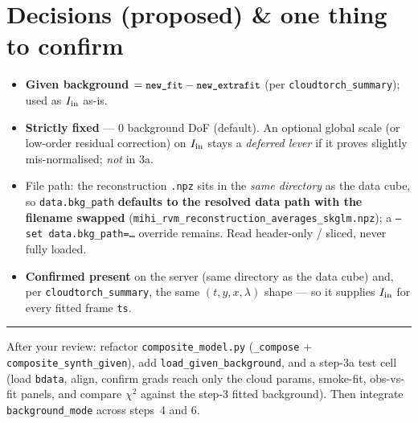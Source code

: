 \documentclass[10pt,a4paper]{article}
\newcommand{\co}[1]{{\small\texttt{#1}}}
\begin{document}
\section{Decisions (proposed) \& one thing to confirm}

\begin{itemize}
\item[\textbf{a}] \textbf{Given background $=\co{new\_fit}-\co{new\_extrafit}$} (per \co{cloudtorch\_summary}); used as $I_{\rm in}$ as-is.
\item[\textbf{b}] \textbf{Strictly fixed} --- 0 background DoF (default). An optional global scale (or low-order residual correction) on $I_{\rm in}$ stays a \emph{deferred lever} if it proves slightly mis-normalised; \emph{not} in 3a.
\item[\textbf{c}] File path: the reconstruction \co{.npz} sits in the \emph{same directory} as the data cube, so \co{data.bkg\_path} \textbf{defaults to the resolved data path with the filename swapped} (\co{mihi\_rvm\_reconstruction\_averages\_skglm.npz}); a \co{--set data.bkg\_path=\ldots} override remains. Read header-only / sliced, never fully loaded.
\item[\textbf{d}] \textbf{Confirmed present} on the server (same directory as the data cube) and, per \co{cloudtorch\_summary}, the same $(t,y,x,\lambda)$ shape --- so it supplies $I_{\rm in}$ for every fitted frame \co{ts}.
\end{itemize}

\vspace{1pt}
{\footnotesize\color{gry}\rule{\textwidth}{0.4pt}}
{\sffamily\color{gry}\footnotesize After your review: refactor \co{composite\_model.py} (\co{\_compose} $+$ \co{composite\_synth\_given}), add \co{load\_given\_background}, and a step-3a test cell (load \co{bdata}, align, confirm grads reach only the cloud params, smoke-fit, obs-vs-fit panels, and compare $\chi^2$ against the step-3 fitted background). Then integrate \co{background\_mode} across steps~4 and 6.}
\end{document}
